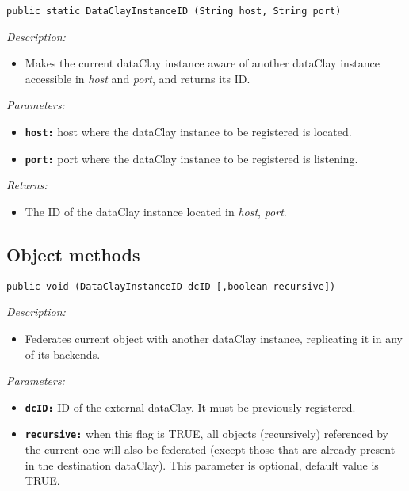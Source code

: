 \begin{dBox}
\texttt{public static DataClayInstanceID (String host, String port)}
\LINE

{\it Description:}

\begin{itemize}
    \item Makes the current dataClay instance aware of another dataClay instance accessible in \textit{host} and \textit{port}, and returns its ID.
\end{itemize}

{\it Parameters:}

\begin{itemize}
  \item \texttt{\bfseries host:} host where the dataClay instance to be registered is located.
  \item \texttt{\bfseries port:} port where the dataClay instance to be registered is listening.
\end{itemize}

{\it Returns:}

\begin{itemize}
 \item The ID of the dataClay instance located in \textit{host}, \textit{port}.
\end{itemize}

\end{dBox}

\subsection{Object methods}
\label{sec:JavaFederationObject}

\begin{dBox}
\texttt{public void (DataClayInstanceID dcID [,boolean recursive])}
\LINE

{\it Description:}

\begin{itemize}
  \item Federates current object with another dataClay instance, replicating it in any of its backends.  
\end{itemize}

{\it Parameters:}

\begin{itemize}
  \item \texttt{\bfseries dcID:} ID of the external dataClay. It must be previously registered.
  \item \texttt{\bfseries recursive:} when this flag is TRUE, all objects (recursively) referenced by the current one will also be federated (except those that are already present in the destination dataClay). This parameter is optional, default value is TRUE.
\end{itemize}

\end{dBox}

